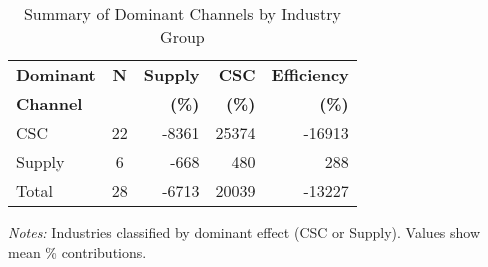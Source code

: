 \begin{table}[htbp]
\centering
\caption{Summary of Dominant Channels by Industry Group}
\label{tab:decomposition_summary}
\begin{tabular}{lcrrr}
\hline\hline
\textbf{Dominant} & \textbf{N} & \textbf{Supply} & \textbf{CSC} & \textbf{Efficiency} \\
\textbf{Channel} & & \textbf{(\%)} & \textbf{(\%)} & \textbf{(\%)} \\ \hline
CSC & 22 & -8361 & 25374 & -16913 \\
Supply & 6 & -668 & 480 & 288 \\
\hline
Total & 28 & -6713 & 20039 & -13227 \\
\hline\hline
\end{tabular}
\begin{flushleft}
\footnotesize \textit{Notes:} Industries classified by dominant effect (CSC or Supply). Values show mean \% contributions.
\end{flushleft}
\end{table}
